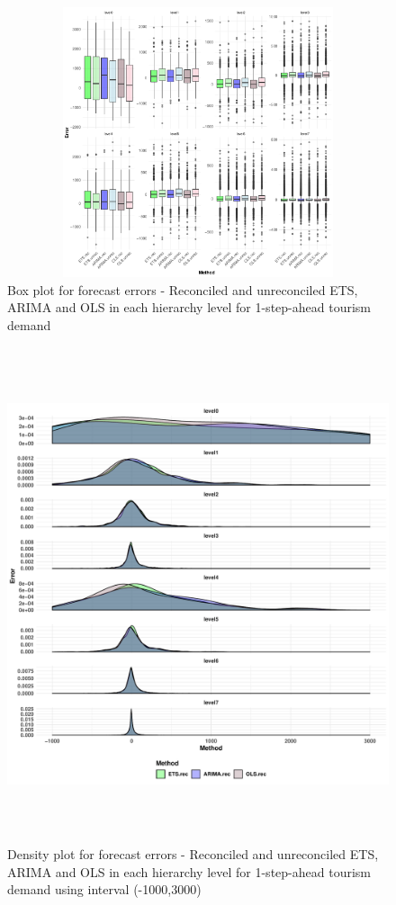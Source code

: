 \documentclass[11pt,a4paper,]{article}
\begin{document}
\begin{figure}

{\centering \includegraphics[width=450px,height=300px]{Paper-Figures/results_Tourism/boxplot_1} 

}

\caption{Box plot for forecast errors - Reconciled and unreconciled ETS, ARIMA and OLS in each hierarchy level for 1-step-ahead tourism demand}\label{fig:boxplotrollingtourism}
\end{figure}

\begin{figure}

{\centering \includegraphics[width=450px,height=550px]{Paper-Figures/results_Tourism/densityplot_1} 

}

\caption{Density plot for forecast errors - Reconciled and unreconciled ETS, ARIMA and OLS in each hierarchy level for 1-step-ahead tourism demand using interval (-1000,3000)}\label{fig:densityplotrollingtourism}
\end{figure}
\end{document}
